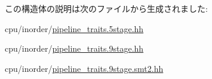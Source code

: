 この構造体の説明は次のファイルから生成されました:\begin{DoxyCompactItemize}
\item 
cpu/inorder/\hyperlink{pipeline__traits_85stage_8hh}{pipeline\_\-traits.5stage.hh}\item 
cpu/inorder/\hyperlink{pipeline__traits_89stage_8hh}{pipeline\_\-traits.9stage.hh}\item 
cpu/inorder/\hyperlink{pipeline__traits_89stage_8smt2_8hh}{pipeline\_\-traits.9stage.smt2.hh}\end{DoxyCompactItemize}

